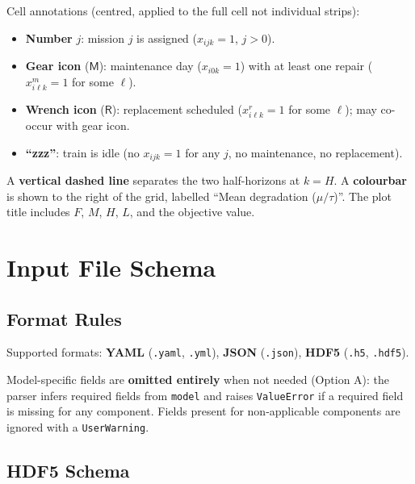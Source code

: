 \documentclass[11pt,a4paper]{article}
\begin{document}
Cell annotations (centred, applied to the full cell not individual strips):
\begin{itemize}
  \item \textbf{Number} $j$: mission $j$ is assigned ($x_{ijk} = 1$, $j > 0$).
  \item \textbf{Gear icon} ($\boldsymbol{\mathsf{M}}$): maintenance day
        ($x_{i0k} = 1$) with at least one repair ($x^m_{i\ell k} = 1$ for some $\ell$).
  \item \textbf{Wrench icon} ($\boldsymbol{\mathsf{R}}$): replacement scheduled
        ($x^r_{i\ell k} = 1$ for some $\ell$); may co-occur with gear icon.
  \item \textbf{``zzz''}: train is idle (no $x_{ijk} = 1$ for any $j$,
        no maintenance, no replacement).
\end{itemize}

A \textbf{vertical dashed line} separates the two half-horizons at $k = H$.
A \textbf{colourbar} is shown to the right of the grid, labelled ``Mean degradation
($\mu / \tau$)''. The plot title includes $F$, $M$, $H$, $L$, and the objective value.

\section{Input File Schema}

\subsection{Format Rules}

Supported formats: \textbf{YAML} (\texttt{.yaml}, \texttt{.yml}),
\textbf{JSON} (\texttt{.json}), \textbf{HDF5} (\texttt{.h5}, \texttt{.hdf5}).

Model-specific fields are \textbf{omitted entirely} when not needed (Option A):
the parser infers required fields from \texttt{model} and raises \texttt{ValueError}
if a required field is missing for any component. Fields present for non-applicable
components are ignored with a \texttt{UserWarning}.

\subsection{HDF5 Schema}
\end{document}
